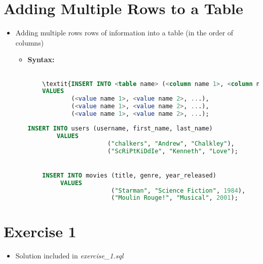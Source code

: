 \documentclass[12pt]{article}
\begin{document}
\section{Adding Multiple Rows to a Table}

\bigskip

\begin{itemize}
    \item Adding multiple rows rows of information into a table (in the order of columns)
    \begin{itemize}
        \item \textbf{Syntax:}

        \bigskip

    \begin{lstlisting}[language=SQL]

    \textit{INSERT INTO <table name> (<column name 1>, <column name 2>, ...)}
    VALUES
            (<value name 1>, <value name 2>, ...),
            (<value name 1>, <value name 2>, ...),
            (<value name 1>, <value name 2>, ...);
    \end{lstlisting}

    \begin{lstlisting}[language=SQL]
    INSERT INTO users (username, first_name, last_name)
        VALUES
                      ("chalkers", "Andrew", "Chalkley"),
                      ("ScRiPtKiDdIe", "Kenneth", "Love");


    INSERT INTO movies (title, genre, year_released)
         VALUES
                       ("Starman", "Science Fiction", 1984),
                       ("Moulin Rouge!", "Musical", 2001);
    \end{lstlisting}

    \end{itemize}
\end{itemize}

\bigskip

\section{Exercise 1}

\bigskip

\begin{itemize}
    \item Solution included in \textit{exercise\_1.sql}
\end{itemize}

\bigskip
\end{document}

